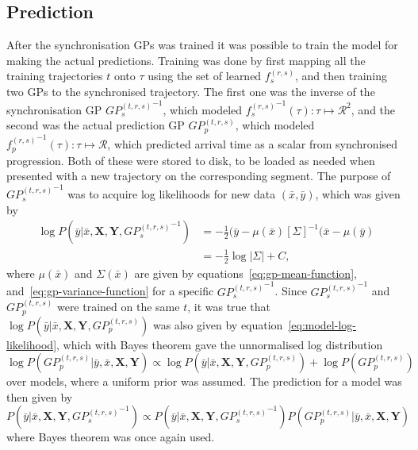 \subsection{Prediction}
After the synchronisation GPs was trained it was possible to train the model for making the actual predictions. Training was done by first mapping all the training trajectories $t$ onto $\tau$ using the set of learned  $f^{(r,s)}_s$, and then training two GPs to the synchronised trajectory. The first one was the inverse of the synchronisation GP ${GP_s^{(t, r,s)}}^{-1}$, which modeled ${f^{(r,s)}_s}^{-1}(\tau) : \tau \mapsto \mathcal{R}^2$, and the second was the actual prediction GP $GP_p^{(t,r,s)}$, which modeled ${f^{(r,s)}_p}^{-1}(\tau) : \tau \mapsto \mathcal{R}$, which predicted arrival time as a scalar from synchronised progression. Both of these were stored to disk, to be loaded as needed when presented with a new trajectory on the corresponding segment.
The purpose of ${GP_s^{(t,r,s)}}^{-1}$ was to acquire log likelihoods for new data $(\bar{x}, \bar{y})$, which was given by
\begin{equation}
  \label{eq:model-log-likelihood}
  \begin{split}
    \log P(\bar{y}|\bar{x}, \textbf{X}, \textbf{Y}, {GP_s^{(t, r,s)}}^{-1}) & = -\frac{1}{2}(\bar{y} - \mu(\bar{x}){[\Sigma]}^{-1}(\bar{x} - \mu(\bar{y}) \\
    & = -\frac{1}{2}\log{|\Sigma|}+C,
  \end{split}
\end{equation}
where $\mu(\bar{x})$ and $\Sigma(\bar{x})$ are given by equations~\ref{eq:gp-mean-function}, and~\ref{eq:gp-variance-function} for a specific ${GP_s^{(t, r,s)}}^{-1}$. Since ${GP_s^{(t,r,s)}}^{-1}$ and $GP_p^{(t,r,s)}$ were trained on the same $t$, it was true that $\log P(\bar{y}|\bar{x}, \textbf{X}, \textbf{Y}, GP_p^{(t, r,s)})$ was also given by equation~\ref{eq:model-log-likelihood}, which with Bayes theorem gave the unnormalised log distribution
$$\log P(GP_p^{(t, r,s)} | \bar{y}, \bar{x}, \textbf{X}, \textbf{Y}) \propto \log P(\bar{y}|\bar{x}, \textbf{X}, \textbf{Y}, GP_p^{(t, r,s)}) + \log P(GP_p^{(t, r,s)})$$
over models, where a uniform prior was assumed. The prediction for a model was then given by
\begin{equation}
  \label{eq:model-prediction-probability}
  P(\bar{y}|\bar{x}, \textbf{X}, \textbf{Y}, {GP_s^{(t, r,s)}}^{-1}) \propto P(\bar{y}|\bar{x}, \textbf{X}, \textbf{Y}, {GP_s^{(t, r,s)}}^{-1})P(GP_p^{(t, r,s)} | \bar{y}, \bar{x}, \textbf{X}, \textbf{Y})
\end{equation}
where Bayes theorem was once again used.

